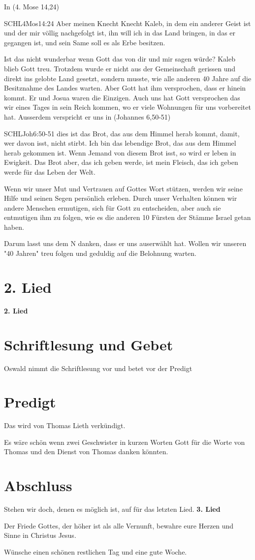 \documentclass{../inc/mybib}
\begin{document}
In (4. Mose 14,24)
\begin{bibelbox}{SCHL}{4Mos}{14:24}
Aber meinen Knecht Knecht Kaleb, in dem ein anderer Geist ist und der mir völlig nachgefolgt ist, ihn will ich in das Land bringen, in das er gegangen ist, und sein Same soll es als Erbe besitzen.
\end{bibelbox}
Ist das nicht wunderbar wenn Gott das von dir und mir sagen würde? Kaleb blieb Gott treu. Trotzdem wurde er nicht aus der Gemeinschaft gerissen und direkt ins gelobte Land gesetzt, sondern musste, wie alle anderen 40 Jahre auf die Besitznahme des Landes warten. Aber Gott hat ihm versprochen, dass er hinein kommt. Er und Josua waren die Einzigen. 
Auch uns hat Gott versprochen das wir eines Tages in sein Reich kommen, wo er viele Wohnungen für uns vorbereitet hat. Ausserdem verspricht er uns in (Johannes 6,50-51)
\begin{bibelbox}{SCHL}{Joh}{6:50-51}
dies ist das Brot, das aus dem Himmel herab kommt, damit, wer davon isst, nicht stirbt. Ich bin das lebendige Brot, das aus dem Himmel herab gekommen ist. Wenn Jemand von diesem Brot isst, so wird er leben in Ewigkeit. Das Brot aber, das ich geben werde, ist mein Fleisch, das ich geben werde für das Leben der Welt.
\end{bibelbox}
Wenn wir unser Mut und Vertrauen auf Gottes Wort stützen, werden wir seine Hilfe und seinen Segen persönlich erleben. Durch unser Verhalten können wir andere Menschen ermutigen, sich für Gott zu entscheiden, aber auch sie entmutigen ihm zu folgen, wie es die anderen 10 Fürsten der Stämme Israel getan haben.

Darum lasst uns dem \herr N danken, dass er uns auserwählt hat. Wollen wir unseren "40 Jahren" treu folgen und geduldig auf die Belohnung warten.

\section{2. Lied}

\textbf{2. Lied}

\section{Schriftlesung und Gebet}
Oswald nimmt die Schriftlesung vor und betet vor der Predigt

\section{Predigt}
Das wird von Thomas Lieth verkündigt.

Es wäre schön wenn zwei Geschwister in kurzen Worten Gott für die Worte von Thomas und den Dienst von Thomas danken könnten.

\section{Abschluss}
Stehen wir doch, denen es möglich ist, auf für das letzten Lied.
\textbf{3. Lied}

Der Friede Gottes, der höher ist als alle Vernunft,
bewahre eure Herzen und Sinne in Christus Jesus.

Wünsche einen schönen restlichen Tag und eine gute Woche.
\end{document}
